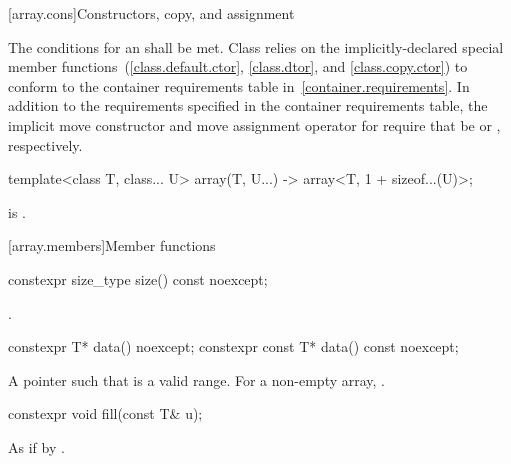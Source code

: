 [array.cons]{Constructors, copy, and assignment}

\pnum
{}%
%
The conditions for an  shall be
met. Class  relies on the implicitly-declared special
member functions~(\ref{class.default.ctor}, \ref{class.dtor}, and \ref{class.copy.ctor}) to
conform to the container requirements table in~\ref{container.requirements}.
In addition to the requirements specified in the container requirements table,
the implicit move constructor and move assignment operator for 
require that  be  or ,
respectively.

\begin{itemdecl}
template<class T, class... U>
  array(T, U...) -> array<T, 1 + sizeof...(U)>;
\end{itemdecl}
\begin{itemdescr}
\pnum
\mandates
{} is .
\end{itemdescr}

[array.members]{Member functions}

%
\begin{itemdecl}
constexpr size_type size() const noexcept;
\end{itemdecl}

\begin{itemdescr}
\pnum
\returns
{}.
\end{itemdescr}

%
\begin{itemdecl}
constexpr T* data() noexcept;
constexpr const T* data() const noexcept;
\end{itemdecl}

\begin{itemdescr}
\pnum
\returns
A pointer such that  is a valid range. For a
non-empty array,  \tcode{==} .
\end{itemdescr}

%
\begin{itemdecl}
constexpr void fill(const T& u);
\end{itemdecl}

\begin{itemdescr}
\pnum
\effects
As if by .
\end{itemdescr}

